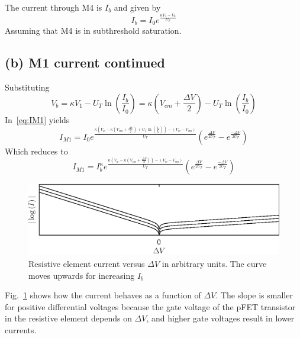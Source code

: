 The current through M4 is \(I_b\) and given by 
\begin{equation*}
    I_b = I_0e^{\frac{\kappa V_1 - V_b}{U_T}}
\end{equation*}
Assuming that M4 is in subthreshold saturation.

\subsection{(b) M1 current continued}
Substituting 
\begin{equation*}
    V_b = \kappa V_1 - U_T\ln\left(\frac{I_b}{I_0}\right) = \kappa \left( V_{cm} + \frac{\Delta V}{2} \right) - U_T\ln\left(\frac{I_b}{I_0}\right)
\end{equation*}
In~\ref{eq:IM1} yields
\begin{equation*}
    I_{M1} = I_0e^{\frac{\kappa (V_w - \kappa \left(V_{cm}+\frac{\Delta V}{2}\right) + U_T\ln\left(\frac{I_b}{I_0}\right)) - (V_w - V_{cm})}{U_T}}\left(e^{\frac{\Delta V}{2U_T}}-e^{\frac{-\Delta V}{2U_T}}\right)
\end{equation*}
Which reduces to
\begin{equation*}
    I_{M1} = I_b^\kappa e^{\frac{\kappa (V_w - \kappa \left(V_{cm}+\frac{\Delta V}{2}\right)) - (V_w - V_{cm})}{U_T}}\left(e^{\frac{\Delta V}{2U_T}}-e^{\frac{-\Delta V}{2U_T}}\right)
\end{equation*}
\begin{figure}
    \center
    \includegraphics{matlabtimes.eps}
    \caption{Resistive element current versus \(\Delta V\) in arbitrary units. The curve moves upwards for increasing \(I_b\)}
    \label{fig:absI}
\end{figure}

Fig.~\ref{fig:absI} shows how the current behaves as a function of \(\Delta V\). The slope is smaller for positive differential voltages
because the gate voltage of the pFET transistor in the resistive element depends on \(\Delta V\), and higher gate voltages result in 
lower currents.

